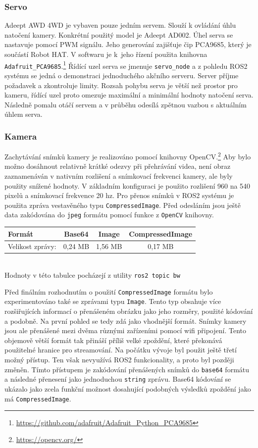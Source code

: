 \subsubsection*{Servo}
Adeept AWD 4WD je vybaven pouze jedním servem. Slouží k ovládání úhlu natočení kamery. Konkrétní použitý model je Adeept AD002. Úhel serva se nastavuje pomocí PWM signálu. Jeho generování zajišťuje čip PCA9685, který je součástí Robot HAT. V softwaru je k~jeho řízení použita knihovna \verb|Adafruit_PCA9685|.\footnote{\url{https://github.com/adafruit/Adafruit_Python_PCA9685}} Řídící uzel serva se jmenuje \verb|servo_node| a z pohledu ROS2 systému se jedná o demonstraci jednoduchého akčního serveru. Server příjme požadavek a zkontroluje limity. 
Rozsah pohybu serva je větší než prostor pro kameru, řídící uzel proto omezuje maximální a minimální hodnoty natočení serva. Následně pomalu otáčí servem a v průběhu odesílá zpětnou vazbou s aktuálním úhlem serva.

\subsubsection*{Kamera} \label{implementation:camera}
Zachytávání snímků kamery je realizováno pomocí knihovny OpenCV.\footnote{\url{https://opencv.org/}} Aby bylo možno dosáhnout relativně krátké odezvy při přehrávání videa, není obraz zaznamenáván v nativním rozlišení a snímkovací frekvenci kamery, ale byly použity snížené hodnoty. V základním konfiguraci je použito rozlišení 960 na 540 pixelů a snímkovací frekvence 20 hz.
Pro přenos snímků v ROS2 systému je použita zpráva vestavěného typu \verb|CompressedImage|. Před odesláním jsou ještě data zakódována do \verb|jpeg| formátu pomocí funkce z \verb|OpenCV| knihovny.

\begin{center}
	\begin{tabular}{| l | c c c |}
		\hline
		Formát & Base64 & Image & CompressedImage \\ 
		\hline
		Velikost zprávy: & 0,24 MB & 1,56 MB & 0,17 MB  \\ 
		\hline 
	\end{tabular} \\ \vspace*{0.5em}
	Hodnoty v této tabulce pocházejí z utility \verb|ros2 topic bw|
\end{center}

Před finálním rozhodnutím o použití \verb|CompressedImage| formátu bylo experimentováno také se zprávami typu \verb|Image|. Tento typ obsahuje více rozšiřujících informací o přenášeném obrázku jako jeho rozměry, použité kódování a podobně. Na první pohled se tedy zdá jako vhodnější formát. Snímky kamery jsou ale přenášené mezi dvěma různými zařízeními pomocí wifi připojení. Tento objemově větší formát tak přináší příliš velké zpoždění, které překonává použitelné hranice pro streamování. Na počátku vývoje byl použit ještě třetí možný přístup. Ten však nevyužívá ROS2 funkcionality, a proto byl později změněn. Tímto přístupem je zakódování přenášených snímků do \verb|base64| formátu a následné přenesení jako jednoduchou \verb|string| zprávu. Base64 kódování se ukázalo jako zcela funkční možnost dosahující podobných výsledků zpoždění jako má \verb|CompressedImage|.
 
